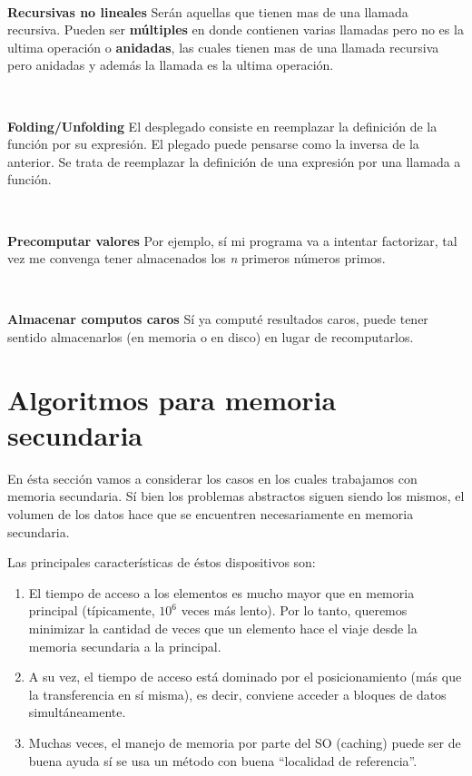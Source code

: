 ~

\textbf{Recursivas no lineales} Ser\'an aquellas que tienen mas de una llamada recursiva. Pueden ser \textbf{m\'ultiples} en donde contienen varias llamadas pero no es la ultima operaci\'on o \textbf{anidadas}, las cuales tienen mas de una llamada recursiva pero anidadas y adem\'as la llamada es la ultima operaci\'on.

~

\textbf{Folding/Unfolding} El desplegado consiste en reemplazar la definici\'on de la funci\'on por su expresi\'on. El plegado puede pensarse como la inversa de la anterior. Se trata de reemplazar la definici\'on de una expresi\'on por una llamada a funci\'on.

~

\textbf{Precomputar valores} Por ejemplo, s\'i mi programa va a intentar factorizar, tal vez me convenga tener almacenados los \textit{n} primeros n\'umeros primos.

~

\textbf{Almacenar computos caros} S\'i ya comput\'e resultados caros, puede tener sentido almacenarlos (en memoria o en disco) en lugar de recomputarlos.



\section{Algoritmos para memoria secundaria}

En \'esta secci\'on vamos a considerar los casos en los cuales trabajamos con memoria secundaria. S\'i bien los problemas abstractos siguen siendo los mismos, el volumen de los datos hace que se encuentren necesariamente en memoria secundaria.

Las principales caracter\'isticas de \'estos dispositivos son:
 \begin{enumerate}
  \item El tiempo de acceso a los elementos es mucho mayor que en memoria principal (t\'ipicamente, $10^6$ veces m\'as lento). Por lo tanto, queremos minimizar la cantidad de veces que un elemento hace el viaje desde la memoria secundaria a la principal.
  \item A su vez, el tiempo de acceso est\'a dominado por el posicionamiento (m\'as que la transferencia en s\'i misma), es decir, conviene acceder a bloques de datos simult\'aneamente.
  \item Muchas veces, el manejo de memoria por parte del SO (caching) puede ser de buena ayuda s\'i se usa un m\'etodo con buena ``localidad de referencia''.
 \end{enumerate}

